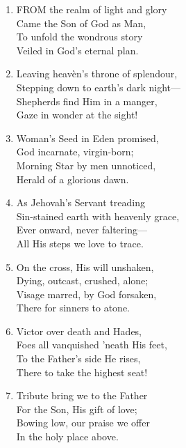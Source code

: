 \documentclass[11pt,a4paper]{article}
\begin{document}
\begin{enumerate}
    \item FROM the realm of light and glory \\
        Came the Son of God as Man, \\
        To unfold the wondrous story \\
        Veiled in God's eternal plan.

    \item Leaving heav\`en's throne of splendour, \\
        Stepping down to earth's dark night--- \\
        Shepherds find Him in a manger, \\
        Gaze in wonder at the sight!

    \item Woman's Seed in Eden promised, \\
        God incarnate, virgin-born; \\
        Morning Star by men unnoticed, \\
        Herald of a glorious dawn.

    \item As Jehovah's Servant treading \\
        Sin-stained earth with heavenly grace, \\
        Ever onward, never faltering--- \\
        All His steps we love to trace.

    \item On the cross, His will unshaken, \\
        Dying, outcast, crushed, alone; \\
        Visage marred, by God forsaken, \\
        There for sinners to atone.

    \item Victor over death and Hades, \\
        Foes all vanquished 'neath His feet, \\
        To the Father's side He rises, \\
        There to take the highest seat!

    \item Tribute bring we to the Father \\
        For the Son, His gift of love; \\
        Bowing low, our praise we offer \\
        In the holy place above.

\end{enumerate}
\end{document}
